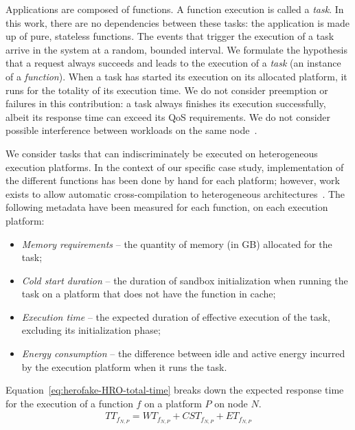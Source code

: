 Applications are composed of functions. A function execution is called a \textit{task}. In this work, there are no dependencies between these tasks: the application is made up of pure, stateless functions. The events that trigger the execution of a task arrive in the system at a random, bounded interval. We formulate the hypothesis that a request always succeeds and leads to the execution of a \textit{task} (an instance of a \textit{function}). When a task has started its execution on its allocated platform, it runs for the totality of its execution time. We do not consider preemption or failures in this contribution: a task always finishes its execution successfully, albeit its response time can exceed its QoS requirements. We do not consider possible interference between workloads on the same node~\cite{dartoisInvestigatingMachineLearning2021}. 

We consider tasks that can indiscriminately be executed on heterogeneous execution platforms. In the context of our specific case study, implementation of the different functions has been done by hand for each platform; however, work exists to allow automatic cross-compilation to heterogeneous architectures~\cite{hortaXartrekRuntimeExecution2021, 10.1145/3445814.3446699}. The following metadata have been measured for each function, on each execution platform: 


\begin{itemize}
    \item \textit{Memory requirements} -- the quantity of memory (in GB) allocated for the task;
    \item \textit{Cold start duration} -- the duration of sandbox initialization when running the task on a platform that does not have the function in cache;
    \item \textit{Execution time} -- the expected duration of effective execution of the task, excluding its initialization phase;
    \item \textit{Energy consumption} -- the difference between idle and active energy incurred by the execution platform when it runs the task.
\end{itemize}

Equation~\ref{eq:herofake-HRO-total-time} breaks down the expected response time for the execution of a function $f$ on a platform $P$ on node $N$.
\begin{equation}
\begin{split}
    {TT}_{{f}_{N, P}} = {WT}_{{f}_{N, P}} + {CST}_{{f}_{N, P}} + {ET}_{{f}_{N, P}}
\end{split}
\label{eq:herofake-HRO-total-time}
\end{equation}

